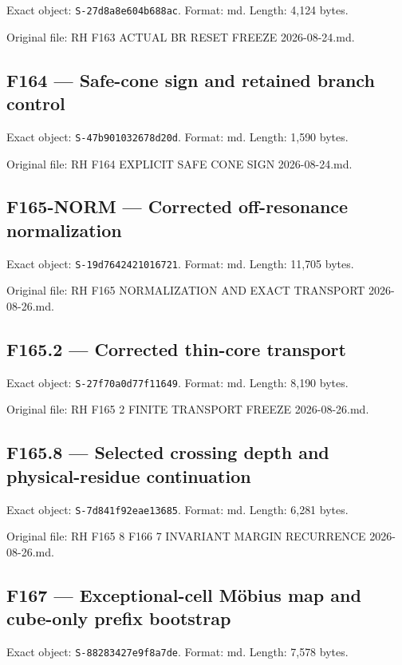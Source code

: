 \documentclass[
  10pt,
  a4paper,
  10pt,
  oneside,
  openany]{book}
\begin{document}
Exact object: \texttt{S-27d8a8e604b688ac}. Format: md. Length: 4,124
bytes.

Original file: RH F163 ACTUAL BR RESET FREEZE 2026-08-24.md.

\subsection{F164 --- Safe-cone sign and retained branch
control}\label{source-f164}

Exact object: \texttt{S-47b901032678d20d}. Format: md. Length: 1,590
bytes.

Original file: RH F164 EXPLICIT SAFE CONE SIGN 2026-08-24.md.

\subsection{F165-NORM --- Corrected off-resonance
normalization}\label{source-f165-norm}

Exact object: \texttt{S-19d7642421016721}. Format: md. Length: 11,705
bytes.

Original file: RH F165 NORMALIZATION AND EXACT TRANSPORT 2026-08-26.md.

\subsection{F165.2 --- Corrected thin-core
transport}\label{source-f165-2}

Exact object: \texttt{S-27f70a0d77f11649}. Format: md. Length: 8,190
bytes.

Original file: RH F165 2 FINITE TRANSPORT FREEZE 2026-08-26.md.

\subsection{F165.8 --- Selected crossing depth and physical-residue
continuation}\label{source-f165-8}

Exact object: \texttt{S-7d841f92eae13685}. Format: md. Length: 6,281
bytes.

Original file: RH F165 8 F166 7 INVARIANT MARGIN RECURRENCE
2026-08-26.md.

\subsection{F167 --- Exceptional-cell Möbius map and cube-only prefix
bootstrap}\label{source-f167}

Exact object: \texttt{S-88283427e9f8a7de}. Format: md. Length: 7,578
bytes.
\end{document}
